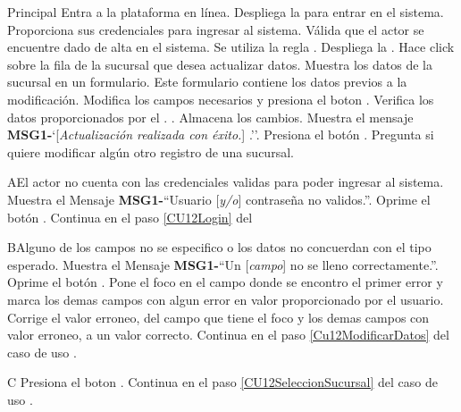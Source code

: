 	\begin{UCtrayectoria}{Principal}
		\UCpaso[\UCactor] Entra a la plataforma en línea. 
		\UCpaso Despliega la \label{CU12Login} para entrar en el sistema.
		\UCpaso[\UCactor] Proporciona sus credenciales para ingresar al sistema.
		\UCpaso Válida que el actor se encuentre dado de alta en el sistema. Se utiliza la regla  .
		\UCpaso Despliega la .\label{CU12SeleccionSucursal}
		\UCpaso[\UCactor] Hace click sobre la fila de la sucursal que desea actualizar datos.
		\UCpaso Muestra los datos de la sucursal en un formulario. Este formulario contiene los datos previos a la modificación.
		\UCpaso[\UCactor] Modifica los campos necesarios y presiona el boton . \label{Cu12ModificarDatos}
		\UCpaso Verifica los datos proporcionados por el \UCactor.  .
		\UCpaso Almacena los cambios.
		\UCpaso Muestra el mensaje {\bf MSG1-}`[{\em Actualización realizada con éxito.}] .''.
		\UCpaso[\UCactor] Presiona el botón . 
		\UCpaso Pregunta si quiere modificar algún otro registro de una sucursal. 
	\end{UCtrayectoria}
	
		\begin{UCtrayectoriaA}{A}{El actor no cuenta con las credenciales validas para poder ingresar al sistema.}
			\UCpaso Muestra el Mensaje {\bf MSG1-}``Usuario [{\em y/o}] contraseña no validos.''.
			\UCpaso[\UCactor] Oprime el botón .
			\UCpaso Continua en el paso \ref{CU12Login} del 
		\end{UCtrayectoriaA}
		
		\begin{UCtrayectoriaA}{B}{Alguno de los campos no se especifico o los datos no concuerdan con el tipo esperado.}
			\UCpaso Muestra el Mensaje {\bf MSG1-}``Un [{\em campo}] no se lleno correctamente.''.
			\UCpaso[\UCactor] Oprime el botón .
			\UCpaso Pone el foco en el campo donde se encontro el primer error y marca los demas campos con algun error en valor proporcionado por el usuario.
			\UCpaso[\UCactor] Corrige el valor erroneo, del campo que tiene el foco y los demas campos con valor erroneo, a un valor correcto.
			\UCpaso Continua en el paso \ref{Cu12ModificarDatos} del caso de uso .
		\end{UCtrayectoriaA}
 
		\begin{UCtrayectoriaA}{C}{}
			\UCpaso[\UCactor] Presiona el boton .
			\UCpaso Continua en el paso \ref{CU12SeleccionSucursal} del caso de uso .
		\end{UCtrayectoriaA}
		
